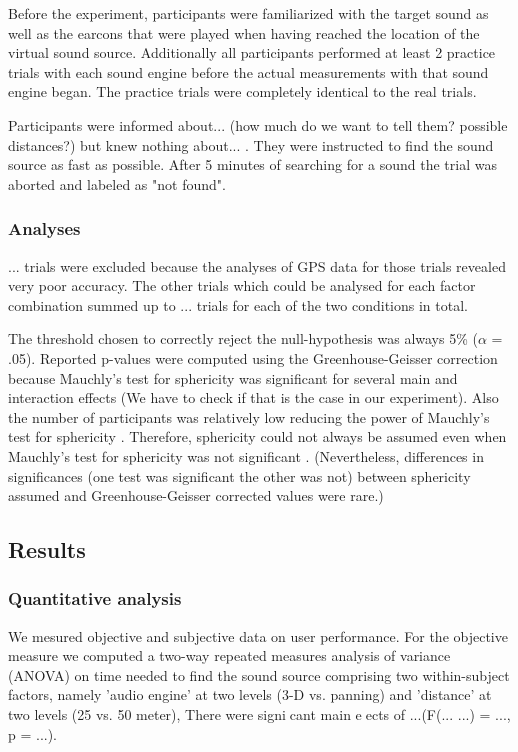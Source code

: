 \documentclass[journal]{IEEEtran}
\begin{document}
Before the experiment, participants were familiarized with the target sound as well as the earcons that were played when having reached the location of the virtual sound source. Additionally all participants performed at least 2 practice trials with each sound engine before the actual measurements with that sound engine began. The practice trials were completely identical to the real trials. 

Participants were informed about... (how much do we want to tell them? possible distances?) but knew nothing about... . They were instructed to find the sound source as fast as possible. After 5 minutes of searching for a sound the trial was aborted and labeled as "not found". 

\subsubsection{Analyses}
... trials were excluded because the analyses of GPS data for those trials revealed very poor accuracy. The other trials which could be analysed for each factor combination summed up to ... trials for each of the two conditions in total.

The threshold chosen to correctly reject the null-hypothesis was always 5\% ($\alpha$ = .05). Reported p-values were computed using the Greenhouse-Geisser correction because Mauchly's test for sphericity was significant for several main and interaction effects (We have to check if that is the case in our experiment). Also the number of participants was relatively low reducing the power of Mauchly's test for sphericity \citep[p. 72]{Rasch2014}. Therefore, sphericity could not always be assumed even when Mauchly's test for sphericity was not significant \citep[p. 72]{Rasch2014}. (Nevertheless, differences in significances (one test was significant the other was not) between sphericity assumed and Greenhouse-Geisser corrected values were rare.) 

\subsection{Results}
\subsubsection{Quantitative analysis}
We mesured objective and subjective data on user performance. 
For the objective measure we computed a two-way repeated measures analysis of variance (ANOVA) on time needed to find the sound source comprising two within-subject factors, namely 'audio engine' at two levels (3-D vs. panning) and 'distance' at two levels (25 vs. 50 meter), There were signicant main eects of ...(F(... ...) = ..., p = ...).
\end{document}
